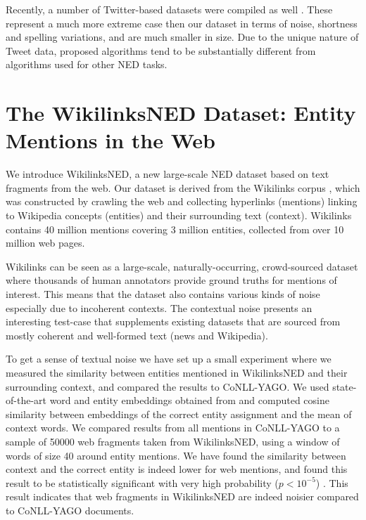 \documentclass[11pt]{article}
\begin{document}
	Recently, a number of Twitter-based datasets were compiled as well \cite{fromreide2014crowdsourcing}. These represent a much more extreme case then our dataset in terms of noise, shortness and spelling variations, and are much smaller in size. Due to the unique nature of Tweet data, proposed algorithms tend to be substantially different from algorithms used for other NED tasks.
	
	\section{The WikilinksNED Dataset: \qquad\qquad Entity Mentions in the Web}
	\label{sec:w}
	
	We introduce WikilinksNED, a new large-scale NED dataset based on text fragments from the web. Our dataset is derived from the Wikilinks corpus \cite{singh12:wiki-links}, which was constructed by crawling the web and collecting hyperlinks (mentions) linking to Wikipedia concepts (entities) and their surrounding text (context). Wikilinks contains 40 million mentions covering 3 million entities, collected from over 10 million web pages. 
	
	Wikilinks can be seen as a large-scale, naturally-occurring, crowd-sourced dataset where thousands of human annotators provide ground truths for mentions of interest. This means that the dataset also contains various kinds of noise especially due to incoherent contexts. The contextual noise presents an interesting test-case that supplements existing datasets that are sourced from mostly coherent and well-formed text (news and Wikipedia). 
	
	To get a sense of textual noise we have set up a small experiment where we measured the similarity between entities mentioned in WikilinksNED and their surrounding context, and compared the results to CoNLL-YAGO. We used state-of-the-art word and entity embeddings obtained from  and computed cosine similarity between embeddings of the correct entity assignment and the mean of context words. We compared results from all mentions in CoNLL-YAGO to a sample of 50000 web fragments taken from WikilinksNED, using a window of words of size 40 around entity mentions. We have found the similarity between context and the correct entity is indeed lower for web mentions, and found this result to be statistically significant with very high probability ($p<10^{-5}$) . This result indicates that web fragments in WikilinksNED are indeed noisier compared to CoNLL-YAGO documents.
	
\end{document}
